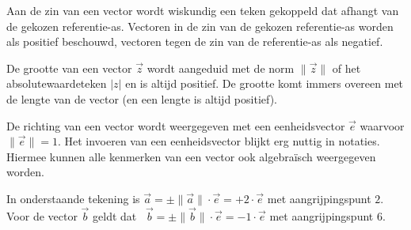 \documentclass{ximera}
\begin{document}
Aan de zin van een vector wordt wiskundig een teken gekoppeld dat afhangt van de gekozen referentie-as. 
Vectoren in de zin van de gekozen referentie-as worden als positief beschouwd, vectoren tegen de zin van de referentie-as als negatief. 

De grootte van een vector \(\vec{z}\) wordt aangeduid met de norm $ \lVert \vec{z} \rVert $  of het absolutewaardeteken $\lvert z \rvert $ en is altijd positief. 
De grootte komt immers overeen met de lengte van de vector (en een lengte is altijd positief). 







De richting van een vector wordt weergegeven met een eenheidsvector $\vec{e}$ waarvoor $ \lVert \vec{e} \rVert = 1$. 
Het invoeren van een eenheidsvector blijkt erg nuttig in notaties. 
Hiermee kunnen alle kenmerken van een vector ook algebraïsch weergegeven worden. 

In onderstaande tekening is \(\vec{a} = \pm  \lVert \vec{a} \rVert \cdot \vec{e} = +2 \cdot \vec{e} \) met aangrijpingspunt \(2\). \\
Voor de vector \(\vec{b}\) geldt dat \ \(\vec{b} = \pm  \lVert \vec{b} \rVert \cdot \vec{e} = -1 \cdot \vec{e} \) met aangrijpingspunt \(6\). 

\end{document}
